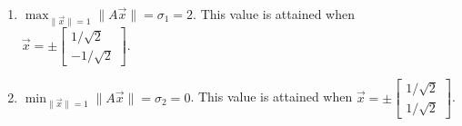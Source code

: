 \begin{enumerate}
\begin{enumerate}
		\end{enumerate}
	\item \(\max_{\|\vec{x}\| = 1} \|A\vec{x}\| = \sigma_1 = 2\). This value is attained when 
		 \(\vec{x} = \pm\begin{bmatrix}1/\sqrt{2} \\ -1/\sqrt{2}\end{bmatrix}\).
	\item \(\min_{\|\vec{x}\| = 1} \|A\vec{x}\| = \sigma_2 = 0\). This value is attained when 
		\(\vec{x} = \pm\begin{bmatrix}1/\sqrt{2} \\ 1/\sqrt{2}\end{bmatrix}\).

\end{enumerate} 
